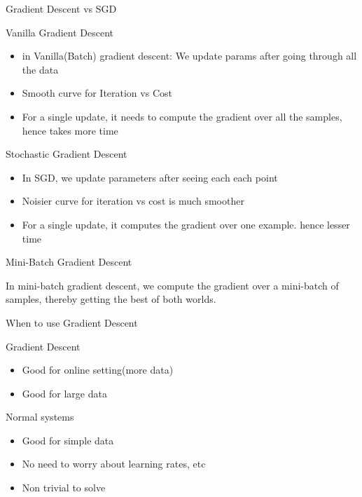 \documentclass{beamer}
\begin{document}
\begin{frame}{Gradient Descent vs SGD}
    
    
    
    Vanilla Gradient Descent
    \begin{itemize}
        \item 
        in Vanilla(Batch) gradient descent: We update params after going through all the data 
        \item Smooth curve for Iteration vs Cost
        \item For a single update, it needs to compute the gradient over all the samples, hence takes more time

    \end{itemize}
    
    Stochastic Gradient Descent
    \begin{itemize}
        \item In SGD, we update parameters after seeing each each point
        \item Noisier curve for iteration vs cost is much smoother
        \item  For a single update, it computes the gradient over one example. hence lesser time
    \end{itemize}
    
      
\end{frame}

\begin{frame}{Mini-Batch Gradient Descent}
    
    In mini-batch gradient descent, we compute the gradient over a mini-batch of samples, thereby getting the best of both worlds.
    
\end{frame}

\begin{frame}{When to use Gradient Descent}


Gradient Descent
\begin{itemize}
    \item Good for online setting(more data)
    \item Good for large data
\end{itemize}


Normal systems
\begin{itemize}
    \item Good for simple data
    \item No need to worry about learning rates, etc
    \item Non trivial to solve
\end{itemize}
\end{frame}
\end{document}
